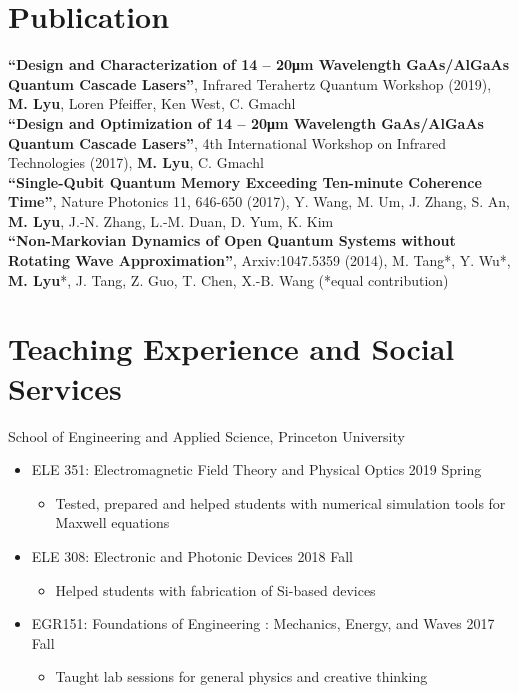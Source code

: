 \documentclass[11pt,letterpaper]{resume}
\begin{document}
\section{Publication}
\textbf{``Design and Characterization of 14 -- 20\si{\micro m} Wavelength 
GaAs/AlGaAs Quantum Cascade Lasers''}, 
Infrared Terahertz Quantum Workshop (2019), 
\textbf{M. Lyu}, Loren Pfeiffer, Ken West, C. Gmachl \\
\textbf{``Design and Optimization of 14 -- 20\si{\micro m} Wavelength 
GaAs/AlGaAs Quantum Cascade Lasers''}, 
4th International Workshop on Infrared Technologies (2017), 
\textbf{M. Lyu}, C. Gmachl \\
\textbf{``Single-Qubit Quantum Memory Exceeding Ten-minute Coherence Time''}, 
Nature Photonics 11, 646-650 (2017), Y. Wang, M. Um, J. Zhang, S. An, 
\textbf{M. Lyu}, J.-N. Zhang, L.-M. Duan, D. Yum, K. Kim \\
\textbf{``Non-Markovian Dynamics of Open Quantum Systems without Rotating 
Wave Approximation''}, 
Arxiv:1047.5359 (2014), 
M. Tang*, Y. Wu*, \textbf{M. Lyu}*, J. Tang, Z. Guo, T. Chen, X.-B. Wang  
(*equal contribution)

\section{Teaching Experience and Social Services}
School of Engineering and Applied Science, Princeton University
\begin{itemize}
    \item ELE 351: Electromagnetic Field Theory and Physical Optics
    \hfill 2019 Spring
    \begin{itemize}
        \item Tested, prepared and helped students with 
        numerical simulation tools for Maxwell equations
    \end{itemize}
    \item ELE 308: Electronic and Photonic Devices
    \hfill 2018 Fall
    \begin{itemize}
        \item Helped students with fabrication of Si-based devices
    \end{itemize}
    \item EGR151: Foundations of Engineering : Mechanics, Energy, and Waves
    \hfill 2017 Fall
    \begin{itemize}
        \item Taught lab sessions for general physics and creative thinking
    \end{itemize}
\end{itemize}\medskip
\end{document}
